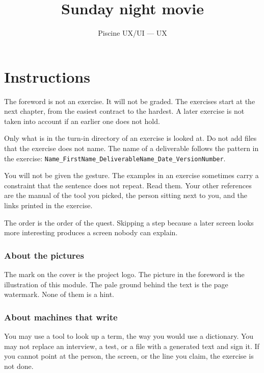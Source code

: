 \documentclass{training}
\begin{document}
\title{Sunday night movie}
\subtitle{Piscine UX/UI --- UX}
\maketitle

\newpage
\tableofcontents
\newpage


\chapter{Instructions}

The foreword is not an exercise. It will not be graded. The exercises start at the next chapter, from the easiest contract to the hardest. A later exercise is not taken into account if an earlier one does not hold.

Only what is in the turn-in directory of an exercise is looked at. Do not add files that the exercise does not name. The name of a deliverable follows the pattern in the exercise: \texttt{Name\_FirstName\_DeliverableName\_Date\_VersionNumber}.

You will not be given the gesture. The examples in an exercise sometimes carry a constraint that the sentence does not repeat. Read them. Your other references are the manual of the tool you picked, the person sitting next to you, and the links printed in the exercise.

The order is the order of the quest. Skipping a step because a later screen looks more interesting produces a screen nobody can explain.

\subsection*{About the pictures}

The mark on the cover is the project logo. The picture in the foreword is the illustration of this module. The pale ground behind the text is the page watermark. None of them is a hint.

\subsection*{About machines that write}

You may use a tool to look up a term, the way you would use a dictionary. You may not replace an interview, a test, or a file with a generated text and sign it. If you cannot point at the person, the screen, or the line you claim, the exercise is not done.
\end{document}
